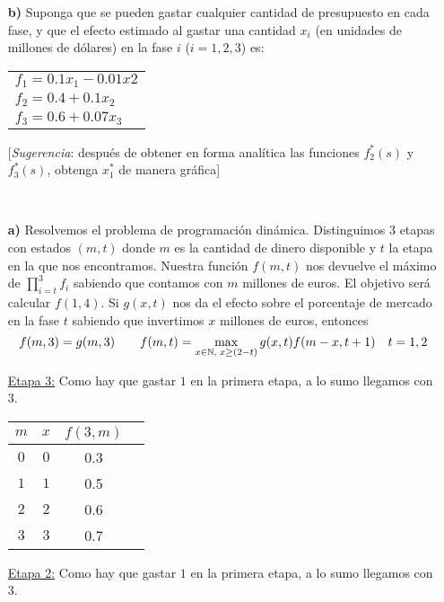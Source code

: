 \documentclass[twoside]{article}
\begin{document}
\begin{ejercicio}{1}
\begin{itemize}
\item[\textbf{b)}] Suponga que se pueden gastar cualquier cantidad de presupuesto en cada fase, y que el efecto estimado al gastar una cantidad $x_i$ (en unidades de millones de dólares) en la fase $i$ ($i=1,2,3$) es:

\begin{tabular}{l}
$f_1=0.1x_1-0.01x2$\\
$f_2=0.4+0.1x_2$\\
$f_3=0.6+0.07x_3$
\end{tabular}

[\emph{Sugerencia}: después de obtener en forma analítica las funciones $f_2^*(s)$ y $f_3^*(s)$, obtenga $x_1^*$ de manera gráfica]
\end{itemize}
\end{ejercicio}
\begin{solucion}
\
\begin{itemize}
\item[\textbf{a)}] 
Resolvemos el problema de programación dinámica. Distinguimos $3$ etapas con estados $(m,t)$ donde $m$ es la cantidad de dinero disponible y $t$ la etapa en la que nos encontramos. Nuestra función $f(m,t)$ nos devuelve el máximo de $\prod_{i=t}^3 f_i$ sabiendo que contamos con $m$ millones de euros. El objetivo será calcular $f(1,4)$. Si $g(x,t)$ nos da el efecto sobre el porcentaje de mercado en la fase $t$ sabiendo que invertimos $x$ millones de euros, entonces
$$
f(m,3) = g(m,3) \qquad f(m,t) = \max_{x\in\mathbb{N},\;x\geq (2-t)} g(x,t)f(m-x,t+1) \quad t=1,2
$$

\underline{Etapa 3:} Como hay que gastar $1$ en la primera etapa, a lo sumo llegamos con $3$.
\begin{center}
\begin{tabular}{|c| c| c| c |}
\hline
$m$ & $x$ & $f(3,m)$ \\
\hline
$0$ & $0$ & 0.3   \\
\hline         
$1$ & $1$ & 0.5 \\
\hline        
$2$ & $2$ & 0.6  \\
\hline
$3$ & $3$  & 0.7   \\
\hline
\end{tabular}
\end{center}
\underline{Etapa 2:} Como hay que gastar $1$ en la primera etapa, a lo sumo llegamos con $3$.


\end{itemize}
\end{solucion}
\end{document}
